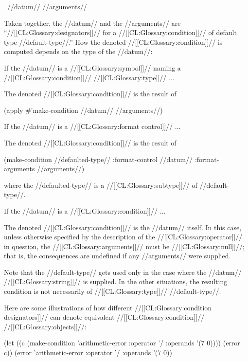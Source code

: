 \ //datum// {\rest} //arguments//

Taken together, the //datum// and the //arguments// are  ``//[[CL:Glossary:designators]]// for a //[[CL:Glossary:condition]]// of default type //default-type//.'' How the denoted //[[CL:Glossary:condition]]// is computed depends on the type of the //datum//:

\beginlist

\item{{\bull} If the //datum// is a //[[CL:Glossary:symbol]]// 
              naming a //[[CL:Glossary:condition]]// //[[CL:Glossary:type]]// $\ldots$}

The denoted //[[CL:Glossary:condition]]// is the result of

\code
 (apply #'make-condition //datum// //arguments//) \endcode

 \item{{\bull} If the //datum// is a //[[CL:Glossary:format control]]// $\ldots$}

The denoted //[[CL:Glossary:condition]]// is the result of 

 \code
 (make-condition //defaulted-type// 
                 :format-control //datum//
                 :format-arguments //arguments//) \endcode

where the //defaulted-type// is a //[[CL:Glossary:subtype]]// of //default-type//.

\item{{\bull} If the //datum// is a //[[CL:Glossary:condition]]// $\ldots$}

The denoted //[[CL:Glossary:condition]]// is the //datum// itself. In this case, unless otherwise specified by the description of the //[[CL:Glossary:operator]]// in question, the //[[CL:Glossary:arguments]]// must be //[[CL:Glossary:null]]//; that is, the consequences are undefined if any //arguments// were supplied. 

\endlist

Note that the //default-type// gets used only in the case where the //datum// //[[CL:Glossary:string]]// is supplied.  In the other situations, the resulting condition is not necessarily of //[[CL:Glossary:type]]// //default-type//.

Here are some illustrations of how different //[[CL:Glossary:condition designators]]// can denote equivalent //[[CL:Glossary:condition]]// //[[CL:Glossary:objects]]//:

 \code (let ((c (make-condition 'arithmetic-error :operator '/ :operands '(7 0))))
  (error c)) \EQ (error 'arithmetic-error :operator '/ :operands '(7 0))

